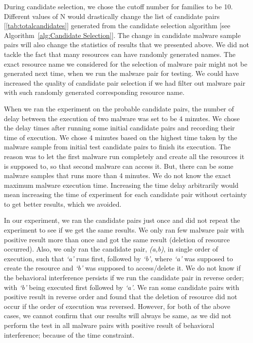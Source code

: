 During candidate selection, we chose the cutoff number for families to be 10.
Different values of N would drastically change the list of candidate pairs [\autoref{tab:totalcandidates}] generated from the candidate selection algorithm [see Algorithm~\autoref{alg:Candidate Selection}].
The change in candidate malware sample pairs will also change the statistics of results that we presented above.
We did not tackle the fact that many resources can have randomly generated names.
The exact resource name we considered for the selection of malware pair might not be generated next time, when we run the malware pair for testing.
We could have increased the quality of candidate pair selection if we had filter out malware pair with such randomly generated corresponding resource name.

When we ran the experiment on the probable candidate pairs, the number of delay between the execution of two malware was set to be 4 minutes.
We chose the delay times after running some initial candidate pairs and recording their time of execution.
We chose 4 minutes based on the highest time taken by the malware sample from initial test candidate pairs to finish its execution.
The reason was to let the first malware run completely and create all the resources it is supposed to, so that second malware can access it.
But, there can be some malware samples that runs more than 4 minutes.
We do not know the exact maximum malware execution time.
Increasing the time delay arbitrarily would mean increasing the time of experiment for each candidate pair without certainty to get better results, which we avoided.

In our experiment, we ran the candidate pairs just once and did not repeat the experiment to see if we get the same results.
We only ran few malware pair with positive result more than once and got the same result (deletion of resource occurred).
Also, we only ran the candidate pair, \emph{(a,b)}, in single order of execution, such that \emph{`a'} runs first, followed by \emph{`b'}, where \emph{`a'} was supposed to create the resource and \emph{`b'} was supposed to access/delete it.
We do not know if the behavioral interference persists if we run the candidate pair in reverse order; with \emph{`b'} being executed first followed by \emph{`a'}.
We ran some candidate pairs with positive result in reverse order and found that the deletion of resource did not occur if the order of execution was reversed.
However, for both of the above cases, we cannot confirm that our results will always be same, as we did not perform the test in all malware pairs with positive result of behavioral interference; because of the time constraint.

